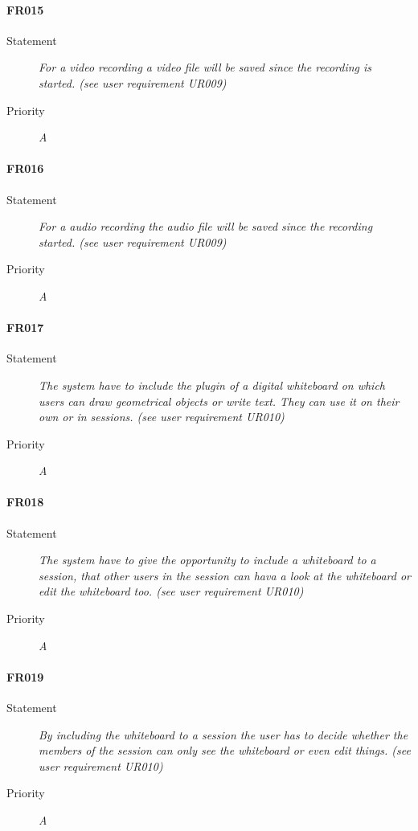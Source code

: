 \paragraph{FR015}
\begin{description}
  \item [Statement] 
    \textit{For a video recording a video file will be saved since the recording is started.
    (see user requirement UR009)}
  \item [Priority] \textit{A}
\end{description}

\paragraph{FR016}
\begin{description}
  \item [Statement] 
    \textit{For a audio recording the audio file will be saved since the recording started.
    (see user requirement UR009)}
  \item [Priority] \textit{A}
\end{description}

\paragraph{FR017}
\begin{description}
  \item [Statement] 
    \textit{The system have to include the plugin of a digital whiteboard on which users can draw geometrical objects or write text. They can use it on their own or in sessions.
    (see user requirement UR010)}
  \item [Priority] \textit{A}
\end{description}

\paragraph{FR018}
\begin{description}
  \item [Statement] 
    \textit{The system have to give the opportunity to include a whiteboard to a session, that other users in the session can hava a look at the whiteboard or edit the whiteboard too.
    (see user requirement UR010)}
  \item [Priority] \textit{A}
\end{description}

\paragraph{FR019}
\begin{description}
  \item [Statement] 
    \textit{By including the whiteboard to a session the user has to decide whether the members of the session can only see the whiteboard or even edit things.
    (see user requirement UR010)}
  \item [Priority] \textit{A}
\end{description}

